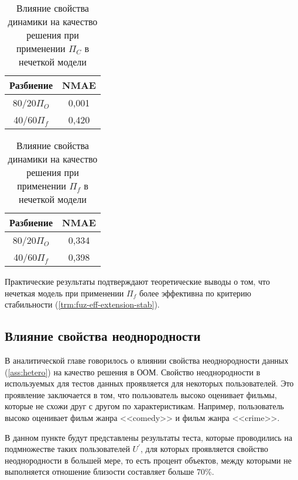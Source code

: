 \begin{table}[h]
	\caption{Влияние свойства динамики на качество решения при применении
	$\Pi_C$ в нечеткой модели}
  \begin{center}
	\label{tbl:dynamic-fuz-com}
	\begin{tabular}{|c|c|}
	  \hline
		Разбиение & NMAE \\ \hline
		80/20$\Pi_{O}$&0,001 \\ \hline
		40/60$\Pi_{f}$&0,420 \\ \hline
	\end{tabular}
  \end{center}
\end{table}

\begin{table}[h]
	\caption{Влияние свойства динамики на качество решения при применении
	$\Pi_f$ в нечеткой модели}
  \begin{center}
	\label{tbl:dynamic-fuz}
	\begin{tabular}{|c|c|}
	  \hline
		Разбиение & NMAE \\ \hline
		80/20$\Pi_{O}$&0,334 \\ \hline
		40/60$\Pi_{f}$&0,398 \\ \hline
	\end{tabular}
  \end{center}
\end{table}
Практические результаты подтверждают теоретические выводы о том,
что нечеткая модель при применении $\Pi_f$ более эффективна по критерию
стабильности (\ref{trm:fuz-eff-extension-stab}).

\subsection{Влияние свойства неоднородности}
В аналитической главе говорилось о влиянии свойства неоднородности данных
(\ref{ass:hetero}) на качество решения в ООМ.
Свойство неоднородности в используемых для тестов данных
проявляется для некоторых пользователей. Это проявление
заключается в том, что пользователь высоко оценивает фильмы,
которые не схожи друг с другом по характеристикам. Например,
пользователь высоко оценивает фильм жанра <<comedy>> и фильм
жанра <<crime>>.

В данном пункте будут представлены результаты теста, которые
проводились на подмножестве таких пользователей $U^{\prime}$,
для которых проявляется свойство неоднородности в большей мере,
то есть процент объектов, между которыми не выполняется отношение близости
составляет больше 70\%.


